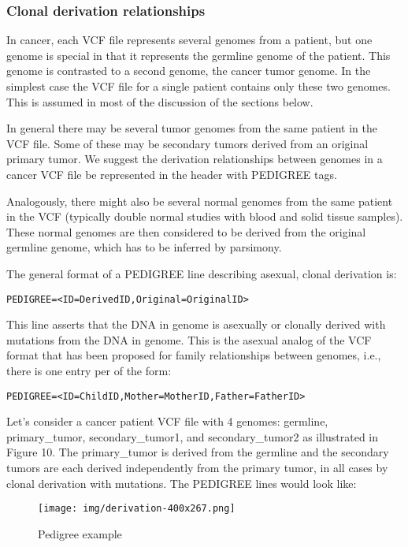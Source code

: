 \documentclass[8pt]{article}
\begin{document}
\subsubsection{Clonal derivation relationships}
\label{PedigreeInDetail}
In cancer, each VCF file represents several genomes from a patient, but one genome is special in that it represents the germline genome of the patient.
This genome is contrasted to a second genome, the cancer tumor genome.
In the simplest case the VCF file for a single patient contains only these two genomes.
This is assumed in most of the discussion of the sections below.

In general there may be several tumor genomes from the same patient in the VCF file.
Some of these may be secondary tumors derived from an original primary tumor.
We suggest the derivation relationships between genomes in a cancer VCF file be represented in the header with PEDIGREE tags.

Analogously, there might also be several normal genomes from the same patient in the VCF (typically double normal studies with blood and solid tissue samples).
These normal genomes are then considered to be derived from the original germline genome, which has to be inferred by parsimony.

The general format of a PEDIGREE line describing asexual, clonal derivation is:

\begin{verbatim}
PEDIGREE=<ID=DerivedID,Original=OriginalID>
\end{verbatim}

This line asserts that the DNA in genome is asexually or clonally derived with mutations from the DNA in genome.
This is the asexual analog of the VCF format that has been proposed for family relationships between genomes, i.e., there is one entry per of the form:

\begin{verbatim}
PEDIGREE=<ID=ChildID,Mother=MotherID,Father=FatherID>
\end{verbatim}

Let's consider a cancer patient VCF file with 4 genomes: germline, primary\_tumor, secondary\_tumor1, and secondary\_tumor2 as illustrated in Figure 10.
The primary\_tumor is derived from the germline and the secondary tumors are each derived independently from the primary tumor, in all cases by clonal derivation with mutations.
The PEDIGREE lines would look like:

\begin{figure}[ht]
\centering
\texttt{[image: img/derivation-400x267.png]}
\caption{Pedigree example}
\end{figure}
\end{document}
